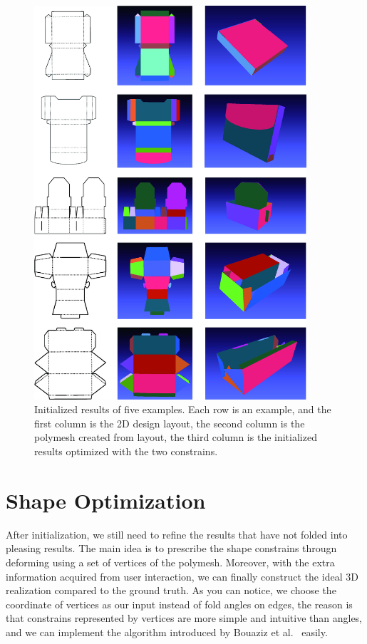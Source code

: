 \documentclass[submission]{gmp2018}
\begin{document}
\begin{figure}
	\centering
	\includegraphics[width=0.9\textwidth]{images/initial.jpg}
	\caption{Initialized results of five examples. Each row is an example, and the first column is the 2D design layout, the second column is the polymesh created from layout, the third column is the initialized results optimized with the two constrains.}
	\label{fig:initial}
\end{figure}


\section{Shape Optimization}\label{sec:optimization}

After initialization, we still need to refine the results that have not folded into pleasing results. The main idea is to prescribe the shape constrains througn deforming using a set of vertices of the polymesh. Moreover, with the extra information acquired from user interaction, we can finally construct the ideal 3D realization compared to the ground truth. As you can notice, we choose the coordinate of vertices as our input instead of fold angles on edges, the reason is that constrains represented by vertices are more simple and intuitive than angles, and we can implement the algorithm introduced by  Bouaziz et al.~\cite{Bouaziz:2012:SSD:2346796.2346802} easily.
\end{document}

